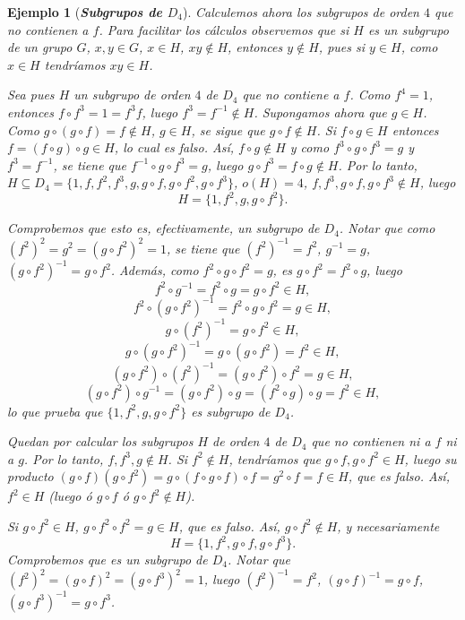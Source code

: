 \documentclass[12pt]{article}
\newtheorem{example}{Ejemplo}[theorem]
\begin{document}
\begin{example} [\textbf{\textit{Subgrupos de $D_4$}}]
Calculemos ahora los subgrupos de orden $4$ que no contienen a $f$. Para facilitar los cálculos observemos que si $H$ es un subgrupo de un grupo $G$, $x,y \in G$, $x\in H$, $xy \notin H$, entonces $y \notin H$, pues si $y \in H$, como $x \in H$ tendríamos $xy \in H$.

Sea pues $H$ un subgrupo de orden $4$ de $D_4$ que no contiene a $f$. Como $f^4 = 1$, entonces $f \circ f^3 = 1 = f^3f$, luego $f^3 = f^{-1} \notin H$. Supongamos ahora que $g \in H$. Como $g \circ (g \circ f) = f \notin H$, $g\in H$, se sigue que $g \circ f \notin H$. Si $f \circ g \in H$ entonces $f = (f \circ g) \circ g \in H$, lo cual es falso. Así, $f \circ g \notin H$ y como $f^3 \circ g \circ f^3 = g$ y $f^3 = f^{-1}$, se tiene que $f^{-1} \circ g \circ f^3 = g$, luego $g \circ f^3 = f \circ g \notin H$. Por lo tanto, $H \subseteq D_4 = \lbrace 1, f, f^2, f^3, g, g\circ f, g \circ f^2, g \circ f^3 \rbrace$, $o(H) = 4$, $f, f^3, g \circ f, g \circ f^3 \notin H$, luego $$H = \lbrace 1, f^2, g, g \circ f^2 \rbrace.$$

Comprobemos que esto es, efectivamente, un subgrupo de $D_4$. Notar que como $(f^2)^2 = g^2 = (g \circ f^2)^2 = 1$, se tiene que $(f^2)^{-1} = f^2$, $g^{-1} = g$, $(g \circ f^2)^{-1} = g\circ f^2$. Además, como $f^2 \circ g \circ f^2 = g$, es $g \circ f^2 = f^2 \circ g$, luego $$f^2 \circ g^{-1} = f^2 \circ g = g \circ f^2 \in H,$$ $$f^2 \circ (g\circ f^2)^{-1} = f^2 \circ g \circ f^2 = g \in H,$$ $$g \circ (f^2)^{-1} = g \circ f^2 \in H ,$$ $$g \circ (g \circ f^2)^{-1} = g \circ (g \circ f^2) = f^2 \in H,$$ $$(g \circ f^2) \circ (f^2)^{-1} = (g \circ f^2) \circ f^2 = g \in H,$$ $$(g \circ f^2) \circ g^{-1} = (g \circ f^2) \circ g = (f^2 \circ g) \circ g = f^2 \in H,$$ lo que prueba que $\lbrace 1, f^2, g, g \circ f^2 \rbrace$ es subgrupo de $D_4$.

Quedan por calcular los subgrupos $H$ de orden $4$ de $D_4$ que no contienen ni a $f$ ni a $g$. Por lo tanto, $f, f^3, g \notin H$. Si $f^2 \notin H$, tendríamos que $g \circ f, g \circ f^2 \in H$, luego su producto $(g \circ f) (g \circ f^2) = g \circ (f \circ g  \circ f) \circ f = g^2 \circ f = f \in H$, que es falso. Así, $f^2 \in H$ (luego ó $g\circ f$ ó $g \circ f^2 \notin H$). 

Si $g \circ f^2 \in H$, $g \circ f^2 \circ f^2 = g \in H$, que es falso. Así, $g \circ f^2 \notin H$, y necesariamente $$H = \lbrace 1, f^2, g\circ f, g \circ f^3 \rbrace.$$
Comprobemos que es un subgrupo de $D_4$. Notar que $(f^2)^2 = (g \circ f)^2 = (g \circ f^3)^2 = 1$, luego $(f^2)^{-1} = f^2$, $(g \circ f)^{-1} = g \circ f$, $(g \circ f^3)^{-1} = g \circ f^3$.


\end{example}
\end{document}
